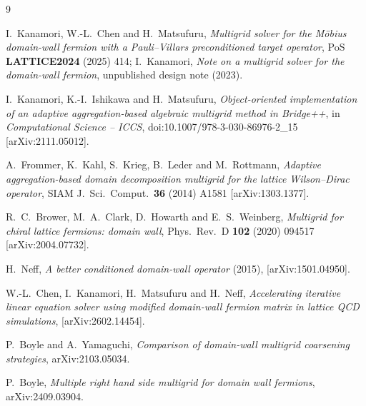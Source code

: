 \documentclass[12pt,a4paper]{article}
\begin{document}
\begin{thebibliography}{9}

I.~Kanamori, W.-L.~Chen and H.~Matsufuru,
\emph{Multigrid solver for the M\"obius domain-wall fermion with a
Pauli--Villars preconditioned target operator},
PoS \textbf{LATTICE2024} (2025) 414;
I.~Kanamori, \emph{Note on a multigrid solver for the domain-wall fermion},
unpublished design note (2023).

I.~Kanamori, K.-I.~Ishikawa and H.~Matsufuru,
\emph{Object-oriented implementation of an adaptive aggregation-based algebraic
multigrid method in Bridge++},
in \emph{Computational Science -- ICCS}, doi:10.1007/978-3-030-86976-2\_15
[arXiv:2111.05012].

A.~Frommer, K.~Kahl, S.~Krieg, B.~Leder and M.~Rottmann,
\emph{Adaptive aggregation-based domain decomposition multigrid for the lattice
Wilson--Dirac operator},
SIAM J.\ Sci.\ Comput.\ \textbf{36} (2014) A1581 [arXiv:1303.1377].

R.~C.~Brower, M.~A.~Clark, D.~Howarth and E.~S.~Weinberg,
\emph{Multigrid for chiral lattice fermions: domain wall},
Phys.\ Rev.\ D \textbf{102} (2020) 094517 [arXiv:2004.07732].

H.~Neff,
\emph{A better conditioned domain-wall operator} (2015),
[arXiv:1501.04950].

W.-L.~Chen, I.~Kanamori, H.~Matsufuru and H.~Neff,
\emph{Accelerating iterative linear equation solver using modified domain-wall
fermion matrix in lattice QCD simulations},
[arXiv:2602.14454].

P.~Boyle and A.~Yamaguchi,
\emph{Comparison of domain-wall multigrid coarsening strategies},
arXiv:2103.05034.

P.~Boyle,
\emph{Multiple right hand side multigrid for domain wall fermions},
arXiv:2409.03904.

\end{thebibliography}
\end{document}
